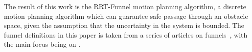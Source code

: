 The result of this work is the RRT-Funnel motion planning algorithm, a discrete
motion planning algorithm which can guarantee safe passage through an obstacle
space, given the assumption that the uncertainty in the system is bounded. The
funnel definitions in this paper is taken from a series of articles on
funnels~\cite{Tobenkin_2011,tedrakeLQRtreesFeedbackMotion2009,
  majumdarRobustOnlineMotion2013,
  majumdarFunnelLibrariesRealtime2017,ahmadi2014dsos}, with the main focus being
on \cite{majumdarFunnelLibrariesRealtime2017}.



